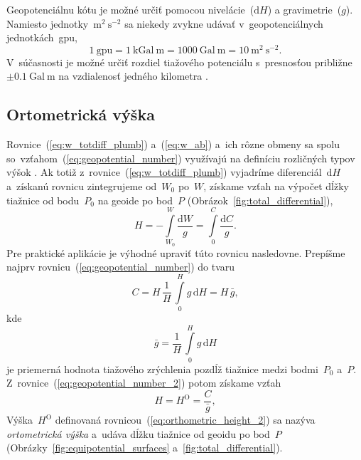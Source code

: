 \documentclass[a4paper, 12pt]{book}
\newcommand{\diff}{\mathrm d}
\begin{document}
Geopotenciálnu kótu je možné určiť pomocou nivelácie~($\diff H$) 
a gravimetrie~($g$).  Namiesto jednotky~$\mathrm{m}^2\ \mathrm{s}^{-2}$ sa 
niekedy zvykne udávať v~geopotenciálnych jednotkách~gpu,
%
\begin{equation}
\label{eq:gpu_unit}
1\ \mathrm{gpu} = 1\ \mathrm{kGal} \ \mathrm{m} = 1000\ \mathrm{Gal}\ 
\mathrm{m} = 10\ \mathrm{m}^2 \ \mathrm{s}^{-2}{.}
\end{equation}
%
V~súčasnosti je možné určiť rozdiel tiažového potenciálu s~presnosťou približne 
$\pm 0.1\ \mathrm{Gal} \ \mathrm{m}$ na vzdialenosť jedného kilometra 
\parencite{MoritzPhysicalGeodesy}.

\subsection{Ortometrická výška}
\label{sec:orthometric_height}

Rovnice~(\ref{eq:w_totdiff_plumb}) a~(\ref{eq:w_ab}) a~ich rôzne obmeny sa 
spolu so~vzťahom~(\ref{eq:geopotential_number}) využívajú na definíciu 
rozličných typov výšok 
\parencite{Jekeli2000a,MoritzPhysicalGeodesy,SansoGeodeticHeights}.  Ak totiž 
z~rovnice~(\ref{eq:w_totdiff_plumb}) vyjadríme diferenciál~$\diff H$ a~získanú 
rovnicu zintegrujeme od~$W_0$ po~$W$, získame vzťah na výpočet dĺžky tiažnice 
od bodu~$P_0$ na geoide po bod~$P$ (Obrázok~\ref{fig:total_differential}),
%
\begin{equation}
\label{eq:orthometric_height_1}
H = -\int\limits_{W_0}^{W} \frac{\diff W}{g} = \int\limits_{0}^{C} \frac{\diff 
C}{g}{.}
\end{equation}
%
Pre praktické aplikácie je výhodné upraviť túto rovnicu nasledovne.  Prepíšme 
najprv rovnicu~(\ref{eq:geopotential_number}) do tvaru 
\parencite{MoritzPhysicalGeodesy}
%
\begin{equation}
\label{eq:geopotential_number_2}
C = H \, \frac{1}{H} \, \int\limits_0^H g \, \diff H = H \, \bar{g}{,}
\end{equation}
%
kde
%
\begin{equation}
\label{eq:mean_g_plumbline}
\bar{g} = \frac{1}{H} \, \int\limits_0^H g \, \diff H
\end{equation}
%
je priemerná hodnota tiažového zrýchlenia pozdĺž tiažnice medzi bodmi~$P_0$ 
a~$P$.  Z~rovnice~(\ref{eq:geopotential_number_2}) potom získame vzťah
%
\begin{equation}
\label{eq:orthometric_height_2}
H = H^\mathrm{O} = \frac{C}{\bar{g}}{,}
\end{equation}
%
Výška~$H^\mathrm{O}$ definovaná rovnicou~(\ref{eq:orthometric_height_2}) sa 
nazýva \emph{ortometrická výška} a~udáva dĺžku tiažnice od geoidu po bod~$P$ 
(Obrázky~\ref{fig:equipotential_surfaces} a~\ref{fig:total_differential}).
\end{document}
